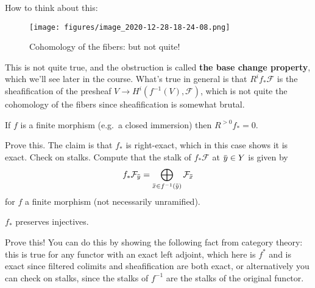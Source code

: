 How to think about this:

\begin{figure}
\centering
\texttt{[image: figures/image\_2020-12-28-18-24-08.png]}
\caption{Cohomology of the fibers: but not quite!}
\end{figure}

This is not quite true, and the obstruction is called \textbf{the base
change property}, which we'll see later in the course. What's true in
general is that \(R^i f_* \mathcal{F}\) is the sheafification of the
presheaf \(V\to H^i(f^{-1}(V), \mathcal{F})\), which is not quite the
cohomology of the fibers since sheafification is somewhat brutal.

\begin{proposition}

If \(f\) is a finite morphism (e.g.~a closed immersion) then
\(R^{>0} f_* = 0\).

\end{proposition}

\begin{exercise}

Prove this. The claim is that \(f_*\) is right-exact, which in this case
shows it is exact. Check on stalks. Compute that the stalk of
\(f_* \mathcal{F}\) at
\(\mkern 1.5mu\overline{\mkern-1.5muy\mkern-1.5mu}\mkern 1.5mu\in Y\) is
given by
\begin{align*}
f_* \mathcal{F}_{\mkern 1.5mu\overline{\mkern-1.5muy\mkern-1.5mu}\mkern 1.5mu} = \bigoplus_{\mkern 1.5mu\overline{\mkern-1.5mux\mkern-1.5mu}\mkern 1.5mu\in f^{-1}(\mkern 1.5mu\overline{\mkern-1.5muy\mkern-1.5mu}\mkern 1.5mu)}\mathcal{F}_{\mkern 1.5mu\overline{\mkern-1.5mux\mkern-1.5mu}\mkern 1.5mu}
\end{align*}
for \(f\) a finite morphism (not necessarily unramified).

\end{exercise}

\begin{proposition}[technical]

\(f_*\) preserves injectives.

\end{proposition}

\begin{exercise}[proof]

Prove this! You can do this by showing the following fact from category
theory: this is true for any functor with an exact left adjoint, which
here is \(f^*\) and is exact since filtered colimits and sheafification
are both exact, or alternatively you can check on stalks, since the
stalks of \(f^{-1}\) are the stalks of the original functor.

\end{exercise}

